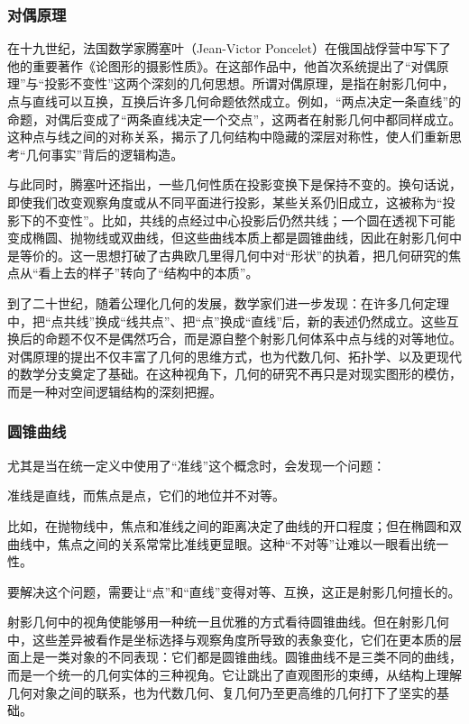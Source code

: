 \subsubsection{对偶原理}

在十九世纪，法国数学家腾塞叶（Jean-Victor Poncelet）在俄国战俘营中写下了他的重要著作《论图形的摄影性质》。在这部作品中，他首次系统提出了“对偶原理”与“投影不变性”这两个深刻的几何思想。所谓对偶原理，是指在射影几何中，点与直线可以互换，互换后许多几何命题依然成立。例如，“两点决定一条直线”的命题，对偶后变成了“两条直线决定一个交点”，这两者在射影几何中都同样成立。这种点与线之间的对称关系，揭示了几何结构中隐藏的深层对称性，使人们重新思考“几何事实”背后的逻辑构造。

与此同时，腾塞叶还指出，一些几何性质在投影变换下是保持不变的。换句话说，即使我们改变观察角度或从不同平面进行投影，某些关系仍旧成立，这被称为“投影下的不变性”。比如，共线的点经过中心投影后仍然共线；一个圆在透视下可能变成椭圆、抛物线或双曲线，但这些曲线本质上都是圆锥曲线，因此在射影几何中是等价的。这一思想打破了古典欧几里得几何中对“形状”的执着，把几何研究的焦点从“看上去的样子”转向了“结构中的本质”。

到了二十世纪，随着公理化几何的发展，数学家们进一步发现：在许多几何定理中，把“点共线”换成“线共点”、把“点”换成“直线”后，新的表述仍然成立。这些互换后的命题不仅不是偶然巧合，而是源自整个射影几何体系中点与线的对等地位。对偶原理的提出不仅丰富了几何的思维方式，也为代数几何、拓扑学、以及更现代的数学分支奠定了基础。在这种视角下，几何的研究不再只是对现实图形的模仿，而是一种对空间逻辑结构的深刻把握。


\subsubsection{圆锥曲线}


尤其是当在统一定义中使用了“准线”这个概念时，会发现一个问题：

准线是直线，而焦点是点，它们的地位并不对等。

比如，在抛物线中，焦点和准线之间的距离决定了曲线的开口程度；但在椭圆和双曲线中，焦点之间的关系常常比准线更显眼。这种“不对等”让难以一眼看出统一性。

要解决这个问题，需要让“点”和“直线”变得对等、互换，这正是射影几何擅长的。




射影几何中的视角使能够用一种统一且优雅的方式看待圆锥曲线。但在射影几何中，这些差异被看作是坐标选择与观察角度所导致的表象变化，它们在更本质的层面上是一类对象的不同表现：它们都是圆锥曲线。圆锥曲线不是三类不同的曲线，而是一个统一的几何实体的三种视角。它让跳出了直观图形的束缚，从结构上理解几何对象之间的联系，也为代数几何、复几何乃至更高维的几何打下了坚实的基础。

